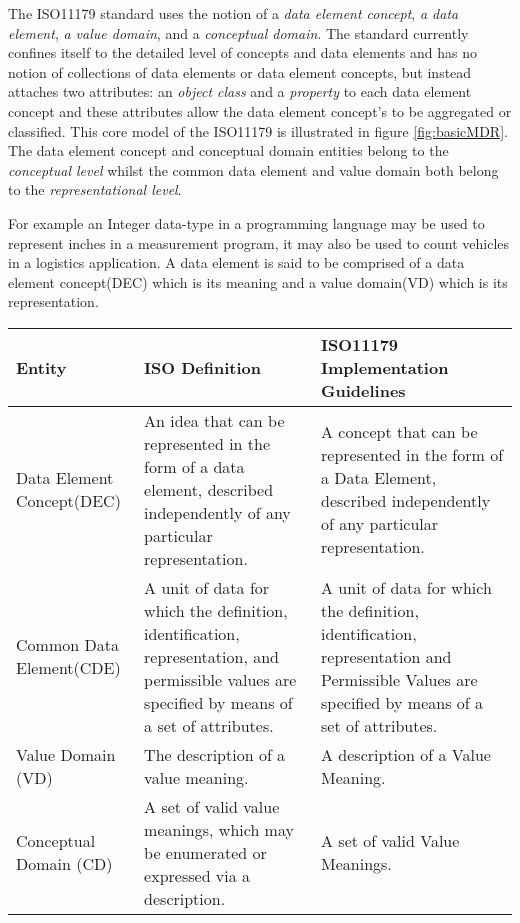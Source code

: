 The ISO11179 standard uses the notion of a \emph{data element concept}, \emph{a data element}, \emph{a value domain}, and a \emph{conceptual domain}. The standard currently confines itself to the detailed level of concepts and data elements and has no notion of collections of data elements or data element concepts, but instead attaches two attributes: an \emph{object class} and a \emph{property} to each data element concept and these attributes allow the data element concept's to be aggregated or classified. This core model of the ISO11179 is illustrated in figure \ref{fig:basicMDR}. The data element concept and conceptual domain entities belong to the \emph{conceptual level}  whilst the common data element and value domain both belong to the \emph{representational level}.


For example an Integer data-type in a programming language may be used to represent inches in a measurement program, it may also be used to count vehicles in a logistics application.  A data element is said to be comprised of a data element concept(DEC) which is its meaning and a value domain(VD) which is its representation.

\begin{table}[h]
	\begin{tabular}{ p{1.8cm} p{2.8cm}  p{3.0cm}  }  %
		\hline
		Entity & ISO Definition & ISO11179 Implementation Guidelines  \\ 
		\hline
		Data Element Concept(DEC) & An idea that can be represented in the form of a data element, described independently of any particular representation. & A concept that can be represented in the form of a Data Element, described independently of any particular representation.\\
		Common Data Element(CDE) & A unit of data for which the definition, identification, representation, and permissible values are specified by means of a set of attributes. & A unit of data for which the definition, identification, representation and Permissible Values are specified by means of a set of attributes. \\
		Value Domain (VD) & The description of a value meaning. & A description of a Value Meaning. \\
		Conceptual Domain (CD) & A set of valid value meanings, which may be enumerated or expressed via a description.& A set of valid Value Meanings.\\
		\hline
	\end{tabular}
\end{table}

